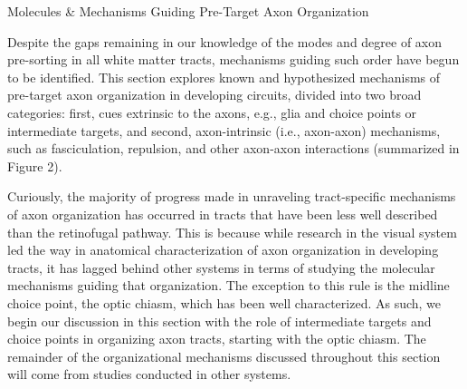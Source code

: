 Molecules & Mechanisms Guiding Pre-Target Axon Organization

Despite the gaps remaining in our knowledge of the modes and degree of axon pre-sorting in all white matter tracts, mechanisms guiding such order have begun to be identified. 
This section explores known and hypothesized mechanisms of pre-target axon organization in developing circuits, divided into two broad categories: first, cues extrinsic to the axons, e.g., glia and choice points or intermediate targets, and second, axon-intrinsic (i.e., axon-axon) mechanisms, such as fasciculation, repulsion, and other axon-axon interactions (summarized in Figure 2).

Curiously, the majority of progress made in unraveling tract-specific mechanisms of axon organization has occurred in tracts that have been less well described than the retinofugal pathway. 
This is because while research in the visual system led the way in anatomical characterization of axon organization in developing tracts, it has lagged behind other systems in terms of studying the molecular mechanisms guiding that organization. 
The exception to this rule is the midline choice point, the optic chiasm, which has been well characterized. As such, we begin our discussion in this section with the role of intermediate targets and choice points in organizing axon tracts, starting with the optic chiasm. 
The remainder of the organizational mechanisms discussed throughout this section will come from studies conducted in other systems. 
